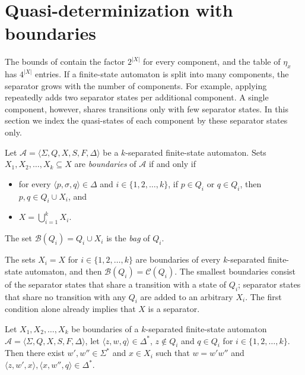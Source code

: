 \section{Quasi-determinization with boundaries}
\label{section:quasi_determinization_boundaries}

The bounds of  contain the factor $2^{|X|}$ for every
component, and the table of $\eta_x$ has $4^{|X|}$ entries. If a finite-state automaton is
split into many components, the separator grows with the number of components. For example,
applying  repeatedly adds two separator states per additional
component. A single component, however, shares transitions only with few separator states.
In this section we index the quasi-states of each component by these separator states only.

\begin{definition}\label{def:boundaries}
  Let $\mathcal{A} = \langle \Sigma, Q, X, S, F, \Delta \rangle$ be a $k$-separated
  finite-state automaton. Sets $X_1, X_2, \ldots, X_k \subseteq X$ are \emph{boundaries} of
  $\mathcal{A}$ if and only if
  \begin{itemize}
    \item for every $\langle p, \sigma, q \rangle \in \Delta$ and $i \in \{ 1, 2, \ldots, k
      \}$, if $p \in Q_i$ or $q \in Q_i$, then $p, q \in Q_i \cup X_i$, and
    \item $X = \bigcup_{i=1}^k X_i$.
  \end{itemize}
  The set $\mathcal{B}(Q_i) = Q_i \cup X_i$ is the \emph{bag} of $Q_i$.
\end{definition}

The sets $X_i = X$ for $i \in \{ 1, 2, \ldots, k \}$ are boundaries of every $k$-separated
finite-state automaton, and then $\mathcal{B}(Q_i) = \mathcal{C}(Q_i)$. The smallest
boundaries consist of the separator states that share a transition with a state of $Q_i$;
separator states that share no transition with any $Q_i$ are added to an arbitrary $X_i$. The
first condition alone already implies that $X$ is a separator.

\begin{proposition}\label{prop:boundary_path}
  Let $X_1, X_2, \ldots, X_k$ be boundaries of a $k$-separated finite-state automaton
  $\mathcal{A} = \langle \Sigma, Q, X, S, F, \Delta \rangle$, let $\langle z, w, q \rangle
  \in \Delta^*$, $z \not\in Q_i$ and $q \in Q_i$ for $i \in \{ 1, 2, \ldots, k \}$. Then
  there exist $w', w'' \in \Sigma^*$ and $x \in X_i$ such that $w = w'w''$ and $\langle z,
  w', x \rangle, \langle x, w'', q \rangle \in \Delta^*$.
\end{proposition}

